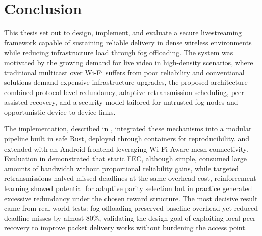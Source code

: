 
\chapter{Conclusion}


\label{Conclusion}



\quad This thesis set out to design, implement, and evaluate a secure livestreaming framework capable of sustaining reliable delivery in dense wireless environments while reducing infrastructure load through fog offloading. The system was motivated by the growing demand for live video in high-density scenarios, where traditional multicast over Wi-Fi suffers from poor reliability and conventional solutions demand expensive infrastructure upgrades, the proposed architecture combined protocol-level redundancy, adaptive retransmission scheduling, peer-assisted recovery, and a security model tailored for untrusted fog nodes and opportunistic device-to-device links. 

\quad The implementation, described in \textbf{}, integrated these mechanisms into a modular pipeline built in safe Rust, deployed through containers for reproducibility, and extended with an Android frontend leveraging Wi-Fi Aware mesh connectivity. Evaluation in \textbf{} demonstrated that static FEC, although simple, consumed large amounts of bandwidth without proportional reliability gains, while targeted retransmissions halved missed deadlines at the same overhead cost, reinforcement learning showed potential for adaptive parity selection but in practice generated excessive redundancy under the chosen reward structure. The most decisive result came from real-world tests: fog offloading preserved baseline overhead yet reduced deadline misses by almost 80\%, validating the design goal of exploiting local peer recovery to improve packet delivery works without burdening the access point.

